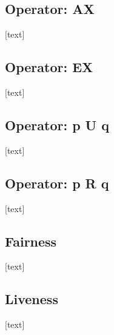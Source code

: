 \documentclass{article}
\begin{document}
		\subsection{Operator: AX}
				
		[text]
		
		\subsection{Operator: EX}
				
		[text]
		
		\subsection{Operator: p U q}
				
		[text]
		
		\subsection{Operator: p R q}
				
		[text]
		
		\subsection{Fairness}
				
		[text]
		
		\subsection{Liveness}
			
		[text]
		
	
	\newpage
	
	
	
	
	
\end{document}
